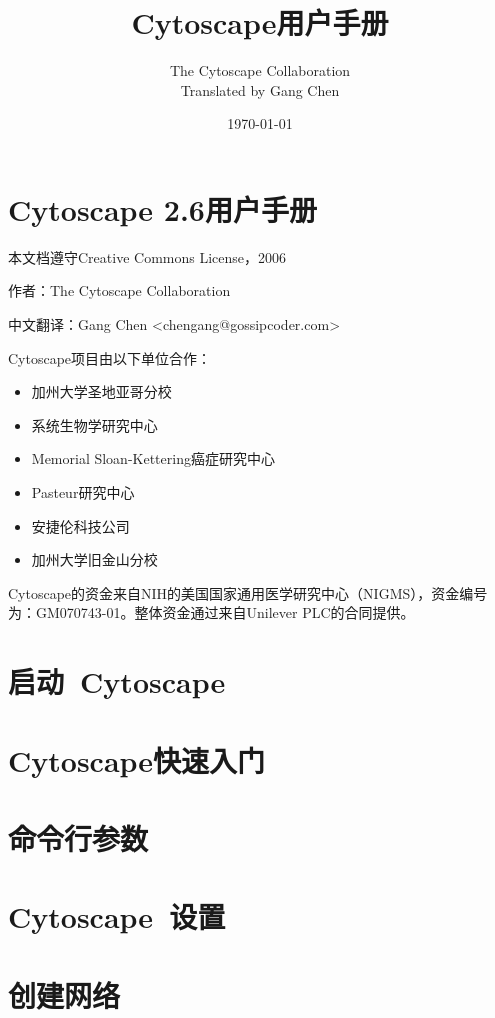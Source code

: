 \documentclass[a4paper, oneside]{book}
\author{The Cytoscape Collaboration \\ Translated by Gang Chen}
\title{Cytoscape用户手册}
\date{\today}
\begin{document}
\begin{CJK}{UTF8}{msyh}
\maketitle
\tableofcontents

\chapter*{Cytoscape 2.6用户手册}
本文档遵守Creative Commons License，2006

作者：The Cytoscape Collaboration

中文翻译：Gang Chen <chengang@gossipcoder.com>

Cytoscape项目由以下单位合作：
\begin{itemize}
\item 加州大学圣地亚哥分校
\item 系统生物学研究中心
\item Memorial Sloan-Kettering癌症研究中心
\item Pasteur研究中心
\item 安捷伦科技公司
\item 加州大学旧金山分校
\end{itemize}

Cytoscape的资金来自NIH的美国国家通用医学研究中心（NIGMS），资金编号为：GM070743-01。整体资金通过来自Unilever PLC的合同提供。



\chapter{启动~Cytoscape}


\chapter{Cytoscape快速入门}


\chapter{命令行参数}


\chapter{Cytoscape~设置}


\chapter{创建网络}



\end{CJK}
\end{document}
